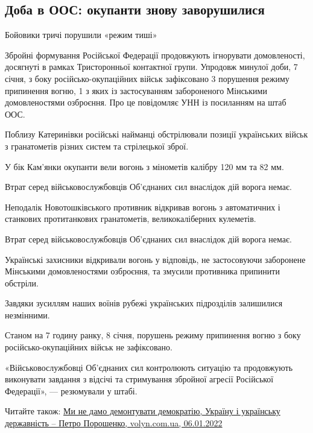  
 
 
 
 
\subsection{Доба в ООС: окупанти знову заворушилися}
\label{sec:08_01_2022.stz.news.ua.volyn.1.okupanty_oos}


\begin{zznagolos}
Бойовики тричі порушили «режим тиші»	
\end{zznagolos}

Збройні формування Російської Федерації продовжують ігнорувати домовленості,
досягнуті в рамках Тристоронньої контактної групи. Упродовж минулої доби, 7
січня, з боку російсько-окупаційних військ зафіксовано 3 порушення режиму
припинення вогню, 1 з яких із застосуванням забороненого Мінськими
домовленостями озброєння. Про це повідомляє УНН із посиланням на штаб ООС.

Поблизу Катеринівки російські найманці обстрілювали позиції українських військ
з гранатометів різних систем та стрілецької зброї.

У бік Кам’янки окупанти вели вогонь з мінометів калібру 120 мм та 82 мм.

\begin{zznagolos}
Втрат серед військовослужбовців Об’єднаних сил внаслідок дій ворога немає.	
\end{zznagolos}

Неподалік Новотошківського противник відкривав вогонь з автоматичних і
станкових протитанкових гранатометів, великокаліберних кулеметів.

Втрат серед військовослужбовців Об’єднаних сил внаслідок дій ворога немає.

Українські захисники відкривали вогонь у відповідь, не застосовуючи заборонене
Мінськими домовленостями озброєння, та змусили противника припинити обстріли.

Завдяки зусиллям наших воїнів рубежі українських підрозділів залишилися
незмінними.

Станом на 7 годину ранку, 8 січня, порушень режиму припинення вогню з боку
російсько-окупаційних військ не зафіксовано.

«Військовослужбовці Об’єднаних сил контролюють ситуацію та продовжують
виконувати завдання з відсічі та стримування збройної агресії Російської
Федерації», — резюмували у штабі.

Читайте також:
\href{https://www.volyn.com.ua/news/202576-my-ne-damo-demontuvaty-demokratiiu-ukrainu-i-ukrainsku-derzhavnist-petro-poroshenko}{%
Ми не дамо демонтувати демократію, Україну і українську державність – Петро Порошенко, volyn.com.ua, 06.01.2022%
}
